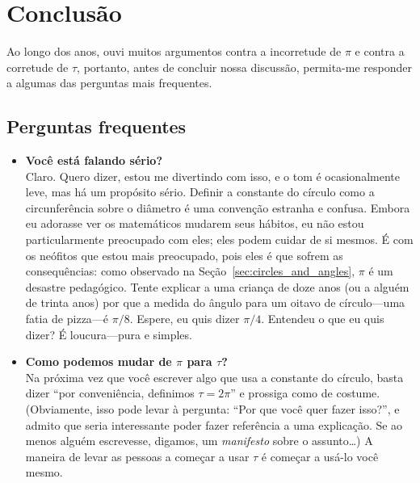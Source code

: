 {  %

\section{Conclusão}
\label{sec:conclusion}

Ao longo dos anos, ouvi muitos argumentos contra a incorretude de $\pi$ e contra a corretude de $\tau$, portanto, antes de concluir nossa discussão, permita-me responder a algumas das perguntas mais frequentes.

  \subsection{Perguntas frequentes} %
  \label{sec:faq}

\begin{itemize}

  \item \textbf{Você está falando sério?} \\ Claro. Quero dizer, estou me divertindo com isso, e o tom é ocasionalmente leve, mas há um propósito sério. Definir a constante do círculo como a circunferência sobre o diâmetro é uma convenção estranha e confusa. Embora eu adorasse ver os matemáticos mudarem seus hábitos, eu não estou particularmente preocupado com eles; eles podem cuidar de si mesmos. É com os neófitos que estou mais preocupado, pois eles é que sofrem as consequências: como observado na Seção~\ref{sec:circles_and_angles}, $\pi$ é um desastre pedagógico. Tente explicar a uma criança de doze anos (ou a alguém de trinta anos) por que a medida do ângulo para um oitavo de círculo---uma fatia de pizza---é $\pi/8$. Espere, eu quis dizer $\pi/4$. Entendeu o que eu quis dizer? É loucura---pura e simples.

  \item \textbf{Como podemos mudar de $\pi$ para $\tau$?} \\ Na próxima vez que você escrever algo que usa a constante do círculo, basta dizer ``por conveniência, definimos $\tau = 2\pi$'' e prossiga como de costume. (Obviamente, isso pode levar à pergunta: ``Por que você quer fazer isso?'', e admito que seria interessante poder fazer referência a uma explicação. Se ao menos alguém escrevesse, digamos, um \emph{manifesto} sobre o assunto\ldots) A maneira de levar as pessoas a começar a usar $\tau$ é começar a usá-lo você mesmo.


\end{itemize}}
